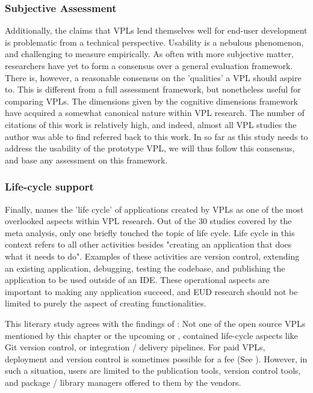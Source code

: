 \subsubsection*{Subjective Assessment}
Additionally, the claims that \ac{VPL}s lend themselves well for end-user development is problematic from a technical perspective. 
Usability is a nebulous phenomenon, and challenging to measure empirically.
As often with more subjective matter, researchers have yet to form a consensus over a general evaluation framework. 
There is, however, a reasonable consensus on the 'qualities' a VPL should aspire to. 
This is different from a full assessment framework, but nonetheless useful for comparing \ac{VPL}s.
The dimensions given by the cognitive dimensions framework \citep{green_usability_1996} have acquired a somewhat canonical nature within \ac{VPL} research.
The number of citations of this work is relatively high, and indeed, almost all \ac{VPL} studies the author was able to find referred back to this work.   
In so far as this study needs to address the usability of the prototype VPL, we will thus follow this consensus, and base any assessment on this framework.


\subsubsection*{Life-cycle support}
Finally, \citet{kuhail_characterizing_2021} names the 'life cycle' of applications created by \ac{VPL}s as one of the most overlooked aspects within VPL research.
Out of the 30 studies covered by the meta analysis, only one briefly touched the topic of life cycle. 
Life cycle in this context refers to all other activities besides "creating an application that does what it needs to do".
Examples of these activities are version control, extending an existing application, debugging, testing the codebase, and publishing the application to be used outside of an \ac{IDE}. 
These operational aspects are important to making any application succeed, and \ac{EUD} research should not be limited to purely the aspect of creating functionalities.

This literary study agrees with the findings of \citet{kuhail_characterizing_2021}: 
Not one of the open source VPLs mentioned by this chapter or the upcoming  or , contained life-cycle aspects like Git version control, or integration / delivery pipelines.
For paid \ac{VPL}s, deployment and version control is sometimes possible for a fee (See \citet{safe-software_fme_2022}). 
However, in such a situation, users are limited to the publication tools, version control tools, and package / library managers offered to them by the vendors.

